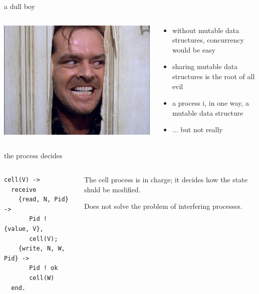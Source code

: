 \begin{frame}{a dull boy}

\begin{columns}
 \begin{column}{0.5\linewidth}
   \includegraphics[width=\linewidth]{shining.jpg}
 \end{column}
 \pause
 \begin{column}{0.5\linewidth}
   \begin {itemize}
    \item without mutable data structures, concurrency would be easy
    \item sharing mutable data structures is the root of all evil
    \item a process i, in one way, a mutable data structure
    \pause
    \item ... but not really
   \end{itemize}
 \end{column}
 \end{columns}

\end{frame}

\begin{frame}[fragile]{the process decides}

\begin{columns}
 \begin{column}{0.5\linewidth}
\begin{verbatim}
cell(V) ->
  receive 
    {read, N, Pid} ->
       Pid ! {value, V},
       cell(V);
    {write, N, W, Pid} ->
       Pid ! ok
       cell(W)
  end.
\end{verbatim}
 \end{column}
\pause
 \begin{column}{0.5\linewidth}

 The cell process is in
 charge; it decides how the state shuld be modified.

 Does not solve the problem of interfering
 processes.

\end{column} \end{columns}

\end{frame}

